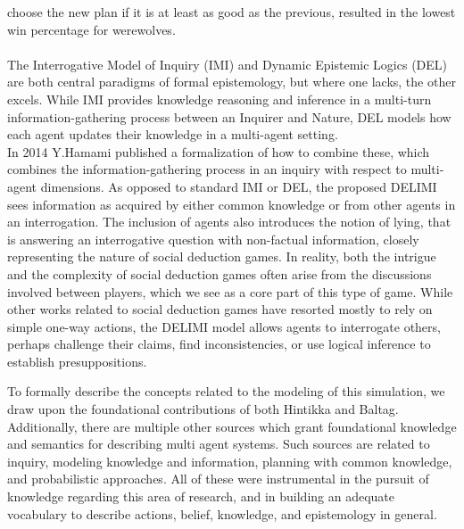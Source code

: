 choose the new plan if it is at least as good as the previous, resulted in the 
lowest win percentage for werewolves. \\ \\
The Interrogative Model of Inquiry (IMI) 
and Dynamic Epistemic Logics (DEL) are both central paradigms of formal 
epistemology, but where one lacks, the other excels. While IMI provides 
knowledge reasoning and inference in a multi-turn information-gathering process 
between an Inquirer and Nature, DEL models how each agent updates their 
knowledge in a multi-agent setting. \\
In 2014 Y.Hamami\cite{delimi} published a 
formalization of how to combine these, which combines the information-gathering 
process in an inquiry with respect to multi-agent dimensions. As opposed to 
standard IMI or DEL, the proposed DELIMI sees information as acquired by either 
common knowledge or from other agents in an interrogation. The inclusion of 
agents also introduces the notion of lying, that is answering an interrogative 
question with non-factual information, closely representing the nature of 
social deduction games. In reality, both the intrigue and the complexity of 
social deduction games often arise from the discussions involved between 
players, which we see as a core part of this type of game. While other works 
related to social deduction games have resorted mostly to rely on simple 
one-way actions, the DELIMI model allows agents to interrogate others, perhaps 
challenge their claims, find inconsistencies, or use logical inference to 
establish presuppositions.

To formally describe the concepts related to the modeling of this simulation, 
we draw upon the foundational contributions of both Hintikka\cite{hintikka} and 
Baltag\cite{Baltag}. Additionally, there are multiple other sources which grant 
foundational knowledge and semantics for describing multi agent systems. Such 
sources are related to inquiry\cite{delimi}, modeling knowledge and 
information\cite{modelling_multi_agent_epistemic_systems}, planning with common 
knowledge\cite{multi_agent_epistemic_planner_common_knowledge}, and 
probabilistic approaches\cite{probibalistic_multiagent_systems}. 
All of these were instrumental in the pursuit of knowledge regarding this area 
of research, and in building an adequate vocabulary to describe actions, 
belief, knowledge, and epistemology in general. 